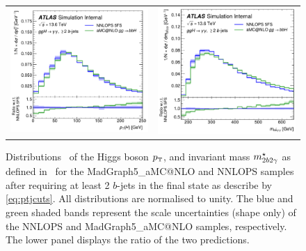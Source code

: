 \documentclass[11pt,a4paper]{article}
\begin{document}
\begin{figure}[t!]
\begin{center}
\begin{tabular}{cc}
\includegraphics[width=.45\textwidth, page=1]{plots/ATLAS/BJetCuts_Higgs1_Pt_shape_comparison_ratio.pdf}&
\includegraphics[width=.44\textwidth, page=1]{plots/ATLAS/BJetCuts_yybb_Mass_shape_comparison_ratio.pdf}
\end{tabular}
\vspace*{1ex}
\caption{Distributions~\cite{atlaspub} of the Higgs boson $\pt$, and invariant mass $m_{2b2\gamma}^{\star}$ as defined in~  for the {\sc MadGraph5\_aMC@NLO} and {\sc NNLOPS} samples after requiring at least 2 $b$-jets in the final state as describe by \eqref{eq:ptjcuts}. All distributions are normalised to unity. The blue and green shaded bands represent the scale uncertainties (shape only) of the {\sc NNLOPS} and {\sc MadGraph5\_aMC@NLO} samples, respectively. The lower panel displays the ratio of the two predictions.\label{fig:4fsNNLOPS}}
\end{center}
\end{figure}

\end{document}
